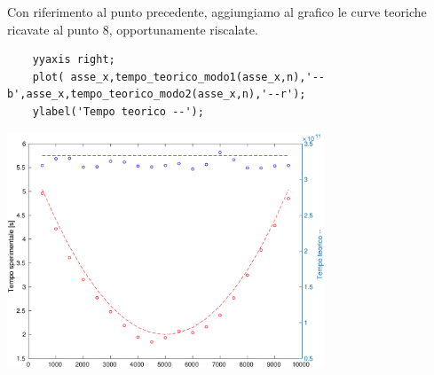 \documentclass{article}
\begin{document}
Con riferimento al punto precedente, aggiungiamo al grafico le curve teoriche ricavate al punto 8, opportunamente riscalate.

\begin{lstlisting}
	yyaxis right;
	plot( asse_x,tempo_teorico_modo1(asse_x,n),'--b',asse_x,tempo_teorico_modo2(asse_x,n),'--r');
	ylabel('Tempo teorico --');
\end{lstlisting}
\begin{center}
\includegraphics[width=0.71\textwidth]{./Esercizi_images/untitled5.eps}
\end{center}
\end{document}
